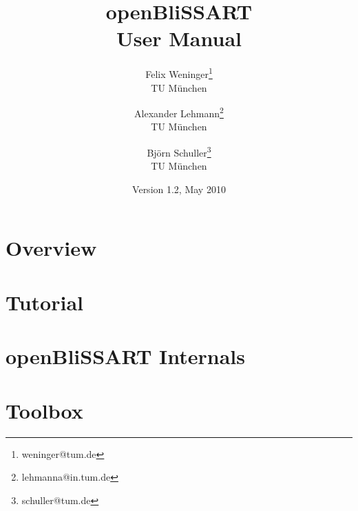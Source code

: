 \documentclass[a4paper,11pt]{book}
\author{
    Felix Weninger\thanks{weninger@tum.de}\\TU M\"unchen
    \and Alexander Lehmann\thanks{lehmanna@in.tum.de}\\TU M\"unchen
    \and Bj\"orn Schuller\thanks{schuller@tum.de}\\TU M\"unchen
}
\date{Version 1.2, May 2010}
\title{
    openBliSSART\\[0.5cm]
    User Manual
}
\begin{document}
\maketitle


\newpage


\tableofcontents




\chapter{Overview}
\label{chapter:Overview}





\chapter{Tutorial}
\label{chapter:Tutorial}





\chapter{openBliSSART Internals}
\label{chapter:RefManual}



\chapter{Toolbox}
\label{chapter:Toolbox}



\clearpage




\end{document}
